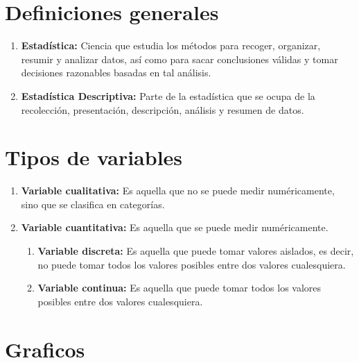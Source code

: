 \documentclass{templateNote}
\begin{document}
\portada
\margenes %

\section{Definiciones generales}
\begin{enumerate}
    \item \textbf{Estadística:} Ciencia que estudia los métodos para recoger, organizar, resumir y analizar datos, así como para sacar conclusiones válidas y tomar decisiones razonables basadas en tal análisis.\\
    \item \textbf{Estadística Descriptiva:} Parte de la estadística que se ocupa de la recolección, presentación, descripción, análisis y resumen de datos.\\
\end{enumerate}
\section{Tipos de variables}
\begin{enumerate}
    \item \textbf{Variable cualitativa:} Es aquella que no se puede medir numéricamente, sino que se clasifica en categorías.\\
    \item \textbf{Variable cuantitativa:} Es aquella que se puede medir numéricamente.\\
    \begin{enumerate}
        \item \textbf{Variable discreta:} Es aquella que puede tomar valores aislados, es decir, no puede tomar todos los valores posibles entre dos valores cualesquiera.\\
        \item \textbf{Variable continua:} Es aquella que puede tomar todos los valores posibles entre dos valores cualesquiera.\\
    \end{enumerate}
\end{enumerate}

\newpage
\section{Graficos}
\end{document}
